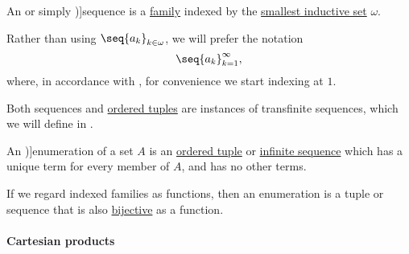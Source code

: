 \begin{definition}\label{def:sequence}
  An  or simply \term[ru=последовательность (\cite[10]{Архангельский1988КанторовскаяТеорияМножеств})]{sequence} is a \hyperref[def:indexed_family]{family} indexed by the \hyperref[thm:smallest_inductive_set_existence]{smallest inductive set} \( \omega \).

  Rather than using \( \seq{ a_k }_{k \in \omega} \), we will prefer the notation
  \begin{equation*}
    \seq{ a_k }_{k=1}^\infty,
  \end{equation*}
  where, in accordance with , for convenience we start indexing at \( 1 \).
\end{definition}
\begin{comments}
  \item Both sequences and \hyperref[def:ordered_tuple]{ordered tuples} are instances of transfinite sequences, which we will define in .
\end{comments}

\begin{definition}\label{def:enumeration}\mimprovised
  An \term[en=enumeration (\cite[190]{Kleene2002Logic})]{enumeration} of a set \( A \) is an \hyperref[def:ordered_tuple]{ordered tuple} or \hyperref[def:sequence]{infinite sequence} which has a unique term for every member of \( A \), and has no other terms.
\end{definition}
\begin{comments}
  \item If we regard indexed families as functions, then an enumeration is a tuple or sequence that is also \hyperref[def:function_invertibility/bijective]{bijective} as a function.
\end{comments}

\paragraph{Cartesian products}

